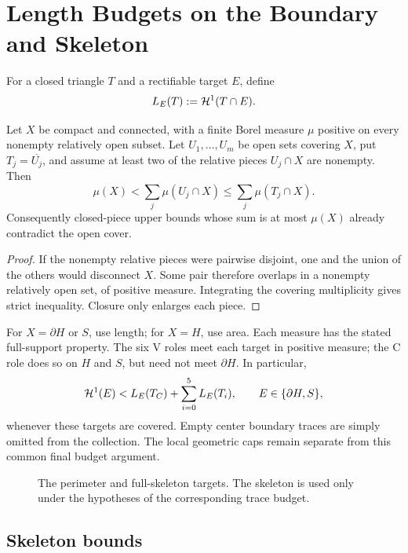 \section{Length Budgets on the Boundary and Skeleton}
\label{sec:trace-length}
\label{sec:length}



For a closed triangle $T$ and a rectifiable target $E$, define
\[
 L_E(T):=\mathcal H^1(T\cap E).
\]
\begin{lemma}
\label{lem:open-cover-budget}
Let $X$ be compact and connected, with a finite Borel measure $\mu$
positive on every nonempty relatively open subset. Let $U_1,\ldots,U_m$
be open sets covering $X$, put $T_j=\overline{U_j}$, and assume at least
two of the relative pieces $U_j\cap X$ are nonempty. Then
\[
 \mu(X)<\sum_j\mu(U_j\cap X)\le\sum_j\mu(T_j\cap X).
\]
Consequently closed-piece upper bounds whose sum is at most $\mu(X)$
already contradict the open cover.
\end{lemma}
\begin{proof}
If the nonempty relative pieces were pairwise disjoint, one and the union
of the others would disconnect $X$. Some pair therefore overlaps in a
nonempty relatively open set, of positive measure. Integrating the covering
multiplicity gives strict inequality. Closure only enlarges each piece.
\end{proof}

For $X=\partial H$ or $S$, use length; for $X=H$, use area. Each measure
has the stated full-support property. The six V roles meet each target
in positive measure; the C role does so on $H$ and $S$, but need not meet
$\partial H$. In particular,
\begin{equation}
 \mathcal H^1(E)<L_E(T_C)+\sum_{i=0}^5L_E(T_i),\qquad E\in\{\partial H,S\},
 \label{eq:length-subadditivity}
\end{equation}
whenever these targets are covered. Empty center boundary traces are simply
omitted from the collection. The local geometric caps remain separate from
this common final budget argument.

\begin{figure}[H]
\centering

\caption{The perimeter and full-skeleton targets.  The skeleton is used only
under the hypotheses of the corresponding trace budget.}
\label{fig:strategy1-targets}
\end{figure}

\subsection{Skeleton bounds}

